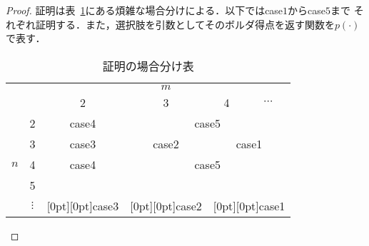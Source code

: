 \documentclass[dvipdfmx]{jsarticle}
\begin{document}
\begin{proof}
  証明は表~\ref{tab:場合分け}にある煩雑な場合分けによる．以下ではcase$1$からcase$5$まで
  それぞれ証明する．また，選択肢を引数としてそのボルダ得点を返す関数を$p(\cdot)$で表す．
  \begin{table}[h]
    \caption{証明の場合分け表}\label{tab:場合分け}
    \begin{center}
      \begin{tabular}{|c|c|c|c|c|c|}\hline
        \multicolumn{2}{|c|}{} & \multicolumn{4}{c|}{$m$} \\ \cline{3-6}
        \multicolumn{2}{|c|}{} & 2 & 3 & 4 & $\cdots$ \\ \hline
          & 2 & case4 & \multicolumn{3}{c|}{case5} \\ \cline{2-6}
          & 3 & case3 & case2 & \multicolumn{2}{c|}{case1} \\ \cline{2-6}
        $n$ & 4 & case4 & \multicolumn{3}{c|}{case5} \\ \cline{2-6}
          & 5 &  &  &  \multicolumn{2}{c|}{}  \\ \cline{2-2}
          & $\vdots$ & \raisebox{.5\normalbaselineskip}[0pt][0pt]{case3}
            & \raisebox{.5\normalbaselineskip}[0pt][0pt]{case2}
            & \multicolumn{2}{c|}{\raisebox{.5\normalbaselineskip}[0pt][0pt]{case1}} \\ \hline
      \end{tabular}
    \end{center}
  \end{table}


\end{proof}
\end{document}
